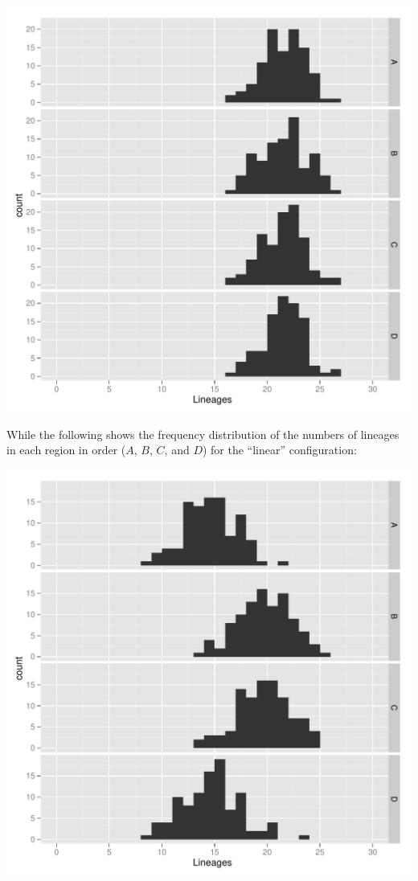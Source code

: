 \documentclass[11pt]{article}
\begin{document}
\begin{center}
	\includegraphics[scale=0.6]{results-lineages-box-d1.pdf}
\end{center}

While the following shows the frequency distribution of the numbers of lineages in each region in order ($A$, $B$, $C$, and $D$) for the ``linear'' configuration:

\begin{center}
	\includegraphics[scale=0.6]{results-lineages-linear-d1.pdf}
\end{center}
\end{document}
